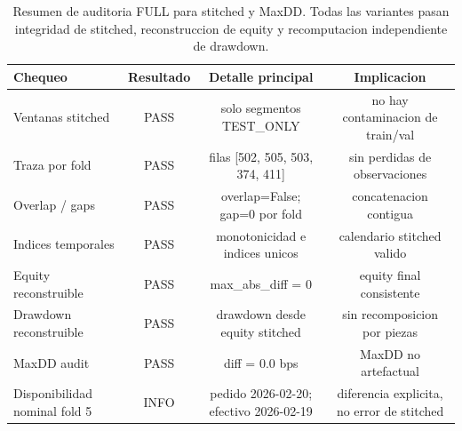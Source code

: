\begin{table}[H]
\centering
\caption{Resumen de auditoria FULL para stitched y MaxDD. Todas las variantes pasan integridad de stitched, reconstruccion de equity y recomputacion independiente de drawdown.}
\label{tab:audit-integrity-maxdd}
\begin{tabular}{lccc}
\toprule
Chequeo & Resultado & Detalle principal & Implicacion \\
\midrule
Ventanas stitched & PASS & solo segmentos TEST\_ONLY & no hay contaminacion de train/val \\
Traza por fold & PASS & filas [502, 505, 503, 374, 411] & sin perdidas de observaciones \\
Overlap / gaps & PASS & overlap=False; gap=0 por fold & concatenacion contigua \\
Indices temporales & PASS & monotonicidad e indices unicos & calendario stitched valido \\
Equity reconstruible & PASS & max\_abs\_diff = 0 & equity final consistente \\
Drawdown reconstruible & PASS & drawdown desde equity stitched & sin recomposicion por piezas \\
MaxDD audit & PASS & diff = 0.0 bps & MaxDD no artefactual \\
Disponibilidad nominal fold 5 & INFO & pedido 2026-02-20; efectivo 2026-02-19 & diferencia explicita, no error de stitched \\
\bottomrule
\end{tabular}
\end{table}
